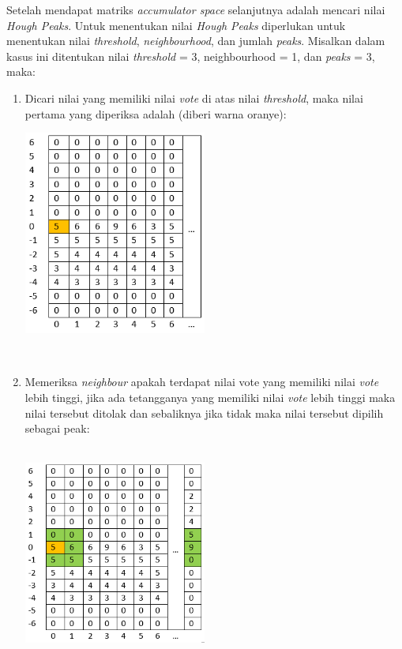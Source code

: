 \noindent Setelah mendapat matriks \textit{accumulator space} selanjutnya adalah mencari nilai \textit{Hough Peaks}. Untuk menentukan nilai \textit{Hough Peaks} diperlukan untuk menentukan nilai \textit{threshold}, \textit{neighbourhood}, dan jumlah \textit{peaks}. Misalkan dalam kasus ini ditentukan nilai \textit{threshold} = 3, neighbourhood = 1, dan \textit{peaks} = 3, maka:
\begin{enumerate}
\item Dicari nilai yang memiliki nilai \textit{vote} di atas nilai \textit{threshold}, maka nilai pertama yang diperiksa adalah (diberi warna oranye):\\
\begin{adjustbox}{width=1\textwidth}
	\noindent\begin{minipage}{\linewidth}
		\centering\includegraphics[width=6cm]{images/AccumulatorSpace3.PNG}
		\label{tab:AccumulatorSpaceFirstCheck}
	\end{minipage}
\end{adjustbox}\\
\item Memeriksa \textit{neighbour} apakah terdapat nilai vote yang memiliki nilai \textit{vote} lebih tinggi, jika ada tetangganya yang memiliki nilai \textit{vote} lebih tinggi maka nilai tersebut ditolak dan sebaliknya jika tidak maka nilai tersebut dipilih sebagai peak:\\
\\
\begin{adjustbox}{width=1\textwidth}
	\noindent\begin{minipage}{\linewidth}
		\centering\includegraphics[width=6cm]{images/AccumulatorSpace4.PNG}

\end{minipage}
\end{adjustbox}
\end{enumerate}
